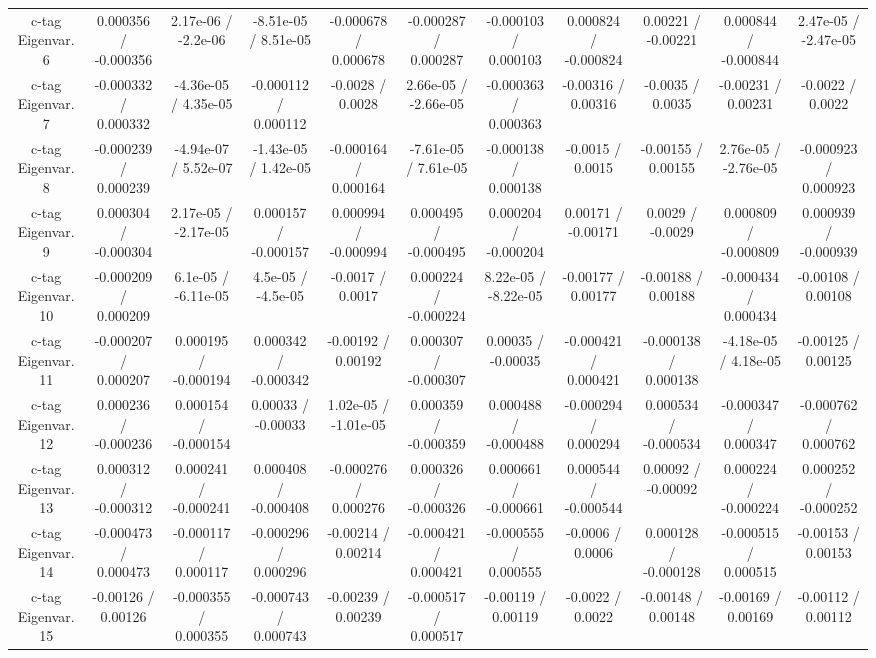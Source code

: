 \begin{table}[htbp]
\begin{center}
\begin{tabular}{|c|c|c|c|c|c|c|c|c|c|c|}
  c-tag Eigenvar. 6 & 0.000356 / -0.000356 & 2.17e-06 / -2.2e-06 & -8.51e-05 / 8.51e-05 & -0.000678 / 0.000678 & -0.000287 / 0.000287 & -0.000103 / 0.000103 & 0.000824 / -0.000824 & 0.00221 / -0.00221 & 0.000844 / -0.000844 & 2.47e-05 / -2.47e-05 \\ 
  c-tag Eigenvar. 7 & -0.000332 / 0.000332 & -4.36e-05 / 4.35e-05 & -0.000112 / 0.000112 & -0.0028 / 0.0028 & 2.66e-05 / -2.66e-05 & -0.000363 / 0.000363 & -0.00316 / 0.00316 & -0.0035 / 0.0035 & -0.00231 / 0.00231 & -0.0022 / 0.0022 \\ 
  c-tag Eigenvar. 8 & -0.000239 / 0.000239 & -4.94e-07 / 5.52e-07 & -1.43e-05 / 1.42e-05 & -0.000164 / 0.000164 & -7.61e-05 / 7.61e-05 & -0.000138 / 0.000138 & -0.0015 / 0.0015 & -0.00155 / 0.00155 & 2.76e-05 / -2.76e-05 & -0.000923 / 0.000923 \\ 
  c-tag Eigenvar. 9 & 0.000304 / -0.000304 & 2.17e-05 / -2.17e-05 & 0.000157 / -0.000157 & 0.000994 / -0.000994 & 0.000495 / -0.000495 & 0.000204 / -0.000204 & 0.00171 / -0.00171 & 0.0029 / -0.0029 & 0.000809 / -0.000809 & 0.000939 / -0.000939 \\ 
  c-tag Eigenvar. 10 & -0.000209 / 0.000209 & 6.1e-05 / -6.11e-05 & 4.5e-05 / -4.5e-05 & -0.0017 / 0.0017 & 0.000224 / -0.000224 & 8.22e-05 / -8.22e-05 & -0.00177 / 0.00177 & -0.00188 / 0.00188 & -0.000434 / 0.000434 & -0.00108 / 0.00108 \\ 
  c-tag Eigenvar. 11 & -0.000207 / 0.000207 & 0.000195 / -0.000194 & 0.000342 / -0.000342 & -0.00192 / 0.00192 & 0.000307 / -0.000307 & 0.00035 / -0.00035 & -0.000421 / 0.000421 & -0.000138 / 0.000138 & -4.18e-05 / 4.18e-05 & -0.00125 / 0.00125 \\ 
  c-tag Eigenvar. 12 & 0.000236 / -0.000236 & 0.000154 / -0.000154 & 0.00033 / -0.00033 & 1.02e-05 / -1.01e-05 & 0.000359 / -0.000359 & 0.000488 / -0.000488 & -0.000294 / 0.000294 & 0.000534 / -0.000534 & -0.000347 / 0.000347 & -0.000762 / 0.000762 \\ 
  c-tag Eigenvar. 13 & 0.000312 / -0.000312 & 0.000241 / -0.000241 & 0.000408 / -0.000408 & -0.000276 / 0.000276 & 0.000326 / -0.000326 & 0.000661 / -0.000661 & 0.000544 / -0.000544 & 0.00092 / -0.00092 & 0.000224 / -0.000224 & 0.000252 / -0.000252 \\ 
  c-tag Eigenvar. 14 & -0.000473 / 0.000473 & -0.000117 / 0.000117 & -0.000296 / 0.000296 & -0.00214 / 0.00214 & -0.000421 / 0.000421 & -0.000555 / 0.000555 & -0.0006 / 0.0006 & 0.000128 / -0.000128 & -0.000515 / 0.000515 & -0.00153 / 0.00153 \\ 
  c-tag Eigenvar. 15 & -0.00126 / 0.00126 & -0.000355 / 0.000355 & -0.000743 / 0.000743 & -0.00239 / 0.00239 & -0.000517 / 0.000517 & -0.00119 / 0.00119 & -0.0022 / 0.0022 & -0.00148 / 0.00148 & -0.00169 / 0.00169 & -0.00112 / 0.00112 \\ 

\end{tabular}
\end{center}
\end{table}
